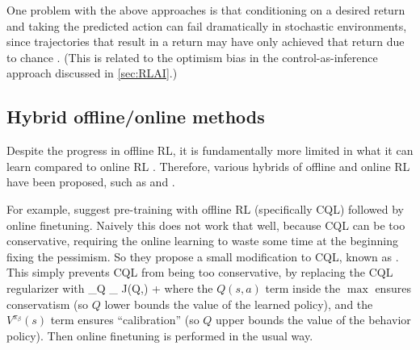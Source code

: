 One problem with the above approaches is that conditioning
on a desired return and taking the predicted action can fail dramatically
in stochastic environments,
since trajectories that result in a return may have only
achieved that return due to chance \citep{Paster2022,Yang2023,Brandfonbrener2022,Villaflor2022}.
(This is related to the optimism bias in the control-as-inference
approach discussed in \cref{sec:RLAI}.)

 
\subsection{Hybrid offline/online methods}

Despite the progress in offline RL, it is fundamentally
more limited in what it can learn compared to online RL
\citep{Ostrovski2021}.
Therefore, various hybrids of offline and online RL have been proposed,
such as
\citep{Ball2023} and \citep{Nakamoto2023}.

For example,
\citep{Nakamoto2023}
suggest pre-training
with offline RL (specifically CQL) followed by online finetuning.
Naively this does not work that well, because CQL can be
too conservative, requiring the online learning
to waste some time at the beginning fixing
the pessimism. So they propose a small
modification to CQL,
known as .
This simply prevents CQL from being too conservative,
by replacing the CQL
regularizer
with
\be
\min_Q \max_{\pi}
J(Q,\pi)    + \alpha  {}
\label{eqn:CalQL}
\ee
where the $Q(s,a)$ term inside the $\max$
ensures conservatism (so $Q$ lower bounds
the value of the learned policy),
and the $V^{\pi_{\beta}}(s)$ term
ensures ``calibration''
(so $Q$ upper bounds the value
of the behavior policy).
Then online finetuning is performed in the usual way.




